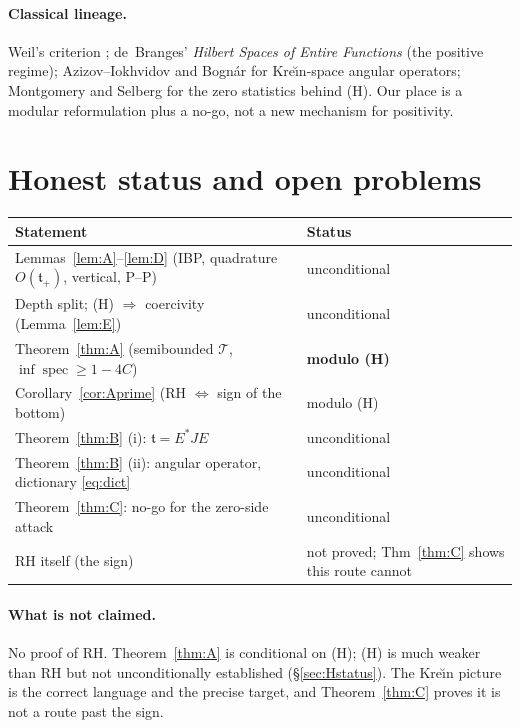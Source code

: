 \documentclass[11pt]{amsart}
\theoremstyle{definition}
\theoremstyle{remark}
\newcommand{\spec}{\operatorname{spec}}
\newcommand{\tform}{\mathfrak t}
\newcommand{\tplus}{\mathfrak t_+}
\newcommand{\Top}{\mathcal T}
\begin{document}
\paragraph{Classical lineage.} Weil's criterion \cite{Weil1952,Bombieri}; de~Branges'
\emph{Hilbert Spaces of Entire Functions} \cite{deBranges} (the positive regime);
Azizov--Iokhvidov \cite{AzizovIokhvidov} and Bogn\'ar \cite{Bognar} for Kre\u{\i}n-space
angular operators; Montgomery \cite{Montgomery} and Selberg \cite{Selberg} for the zero
statistics behind (H). Our place is a modular reformulation plus a no-go, not a new
mechanism for positivity.

\section{Honest status and open problems}\label{sec:open}

\begin{center}
\small
\begin{tabular}{ll}
\toprule
Statement & Status \\
\midrule
Lemmas~\ref{lem:A}--\ref{lem:D} (IBP, quadrature $O(\tplus)$, vertical, P--P) & unconditional \\
Depth split; (H) $\Rightarrow$ coercivity (Lemma~\ref{lem:E}) & unconditional \\
Theorem~\ref{thm:A} (semibounded $\Top$, $\inf\spec\ge1-4C$) & \textbf{modulo (H)} \\
Corollary~\ref{cor:Aprime} (RH $\iff$ sign of the bottom) & modulo (H) \\
Theorem~\ref{thm:B} (i): $\tform=E^{*}JE$ & unconditional \\
Theorem~\ref{thm:B} (ii): angular operator, dictionary \eqref{eq:dict} & unconditional \\
Theorem~\ref{thm:C}: no-go for the zero-side attack & unconditional \\
RH itself (the sign) & not proved; Thm~\ref{thm:C} shows this route cannot \\
\bottomrule
\end{tabular}
\end{center}

\paragraph{What is not claimed.} No proof of RH. Theorem~\ref{thm:A} is conditional on
(H); (H) is much weaker than RH but not unconditionally established (\S\ref{sec:Hstatus}).
The Kre\u{\i}n picture is the correct language and the precise target, and
Theorem~\ref{thm:C} proves it is not a route past the sign.
\end{document}
